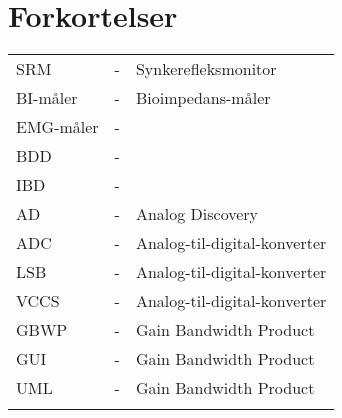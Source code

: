 \chapter{Forkortelser}

\begin{table}[H]
\center
{}
\begin{tabularx}{\linewidth}{l l X}	
SRM         & - &   Synkerefleksmonitor \\ \addlinespace[2mm]
BI-måler         & - &   Bioimpedans-måler \\ \addlinespace[2mm]
EMG-måler   & - &    \\ \addlinespace[2mm]
BDD   & - &    \\ \addlinespace[2mm]
IBD  & - &    \\ \addlinespace[2mm]
AD  & - &  Analog Discovery  \\ \addlinespace[2mm]
ADC  & - &  Analog-til-digital-konverter  \\ \addlinespace[2mm]
LSB  & - &  Analog-til-digital-konverter  \\ \addlinespace[2mm]
VCCS & - &  Analog-til-digital-konverter  \\ \addlinespace[2mm]
GBWP & - &  Gain Bandwidth Product  \\ \addlinespace[2mm]
GUI & - &  Gain Bandwidth Product  \\ \addlinespace[2mm]
UML & - &  Gain Bandwidth Product  \\ \addlinespace[2mm]
\end{tabularx}
\end{table}